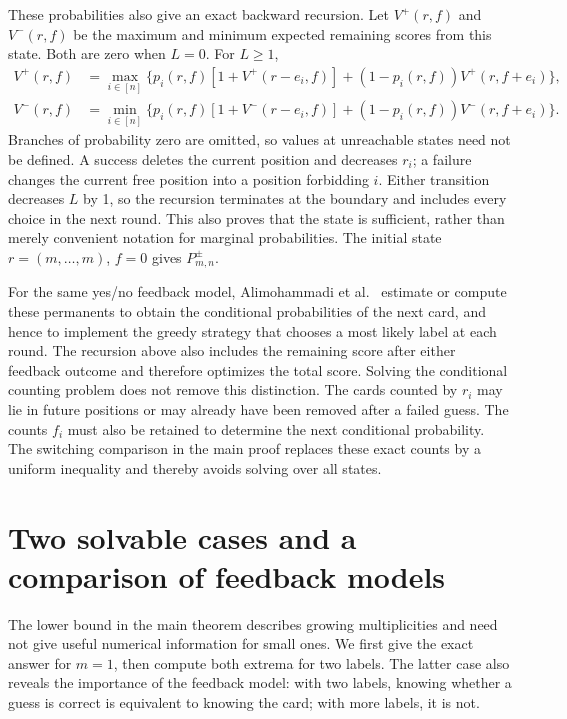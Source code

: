 \documentclass[11pt,reqno]{amsart}
\numberwithin{equation}{section}
\theoremstyle{remark}
\theoremstyle{definition}
\begin{document}
These probabilities also give an exact backward recursion. Let $V^+(r,f)$ and $V^-(r,f)$ be the maximum and minimum expected remaining scores from this state. Both are zero when $L=0$. For $L\ge1$,
\begin{align*}
 V^+(r,f)&=\max_{i\in[n]}
 \{p_i(r,f)[1+V^+(r-e_i,f)]
 +(1-p_i(r,f))V^+(r,f+e_i)\},\\
 V^-(r,f)&=\min_{i\in[n]}
 \{p_i(r,f)[1+V^-(r-e_i,f)]
 +(1-p_i(r,f))V^-(r,f+e_i)\}.
\end{align*}
Branches of probability zero are omitted, so values at unreachable states need not be defined. A success deletes the current position and decreases $r_i$; a failure changes the current free position into a position forbidding $i$. Either transition decreases $L$ by 1, so the recursion terminates at the boundary and includes every choice in the next round. This also proves that the state is sufficient, rather than merely convenient notation for marginal probabilities. The initial state $r=(m,\ldots,m)$, $f=0$ gives $P^\pm_{m,n}$.

For the same yes/no feedback model, Alimohammadi et al.~\cite[Section~4.2 and Appendix~C]{ADRS} estimate or compute these permanents to obtain the conditional probabilities of the next card, and hence to implement the greedy strategy that chooses a most likely label at each round. The recursion above also includes the remaining score after either feedback outcome and therefore optimizes the total score. Solving the conditional counting problem does not remove this distinction. The cards counted by $r_i$ may lie in future positions or may already have been removed after a failed guess. The counts $f_i$ must also be retained to determine the next conditional probability. The switching comparison in the main proof replaces these exact counts by a uniform inequality and thereby avoids solving over all states.

\section{Two solvable cases and a comparison of feedback models}\label{app:feedback}
The lower bound in the main theorem describes growing multiplicities and need not give useful numerical information for small ones. We first give the exact answer for $m=1$, then compute both extrema for two labels. The latter case also reveals the importance of the feedback model: with two labels, knowing whether a guess is correct is equivalent to knowing the card; with more labels, it is not.
\end{document}
